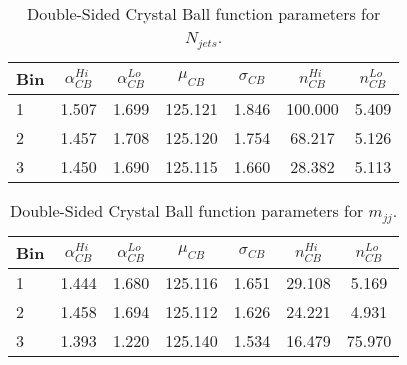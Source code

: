 \begin{table}[h]
\centering
\small
\caption{Double-Sided Crystal Ball function parameters for $N_{jets}$.}
\vspace{0.4cm}
\begin{tabular}{l | cccccc}
Bin &  $\alpha_{CB}^{Hi}$ &  $\alpha_{CB}^{Lo}$ &  $\mu_{CB}$ &  $\sigma_{CB}$ &  $n_{CB}^{Hi}$ &  $n_{CB}^{Lo}$ \\
\hline
1   &                     1.507 &                     1.699 &     125.121 &          1.846 &               100.000 &                 5.409 \\
2   &                     1.457 &                     1.708 &     125.120 &          1.754 &                68.217 &                 5.126 \\
3   &                     1.450 &                     1.690 &     125.115 &          1.660 &                28.382 &                 5.113 \\
\end{tabular}
\end{table}

\begin{table}[h]
\centering
\small
\caption{Double-Sided Crystal Ball function parameters for $m_{jj}$.}
\vspace{0.4cm}
\begin{tabular}{l | cccccc}
Bin &  $\alpha_{CB}^{Hi}$ &  $\alpha_{CB}^{Lo}$ &  $\mu_{CB}$ &  $\sigma_{CB}$ &  $n_{CB}^{Hi}$ &  $n_{CB}^{Lo}$ \\
\hline
1   &                     1.444 &                     1.680 &     125.116 &          1.651 &                29.108 &                 5.169 \\
2   &                     1.458 &                     1.694 &     125.112 &          1.626 &                24.221 &                 4.931 \\
3   &                     1.393 &                     1.220 &     125.140 &          1.534 &                16.479 &                75.970 \\
\end{tabular}
\end{table}